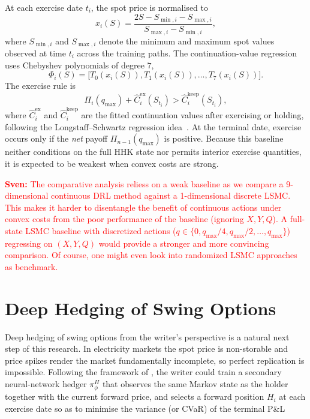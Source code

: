 \documentclass[a4paper,fleqn]{cas-dc}
\begin{document}
At each exercise date $t_i$, the spot price is normalised to
\[
x_i(S) =
\frac{2S - S_{\min,i} - S_{\max,i}}{S_{\max,i} - S_{\min,i}},
\]
where $S_{\min,i}$ and $S_{\max,i}$ denote the minimum and maximum spot values observed at time $t_i$ across the training paths. The continuation-value regression uses Chebyshev polynomials of degree $7$,
\[
\Phi_i(S) =
\bigl[T_0(x_i(S)),T_1(x_i(S)),\dots,T_7(x_i(S))\bigr].
\]
The exercise rule is
\[
\Pi_i(q_{\max}) + \widehat{C}_i^{\mathrm{ex}}(S_{t_i})
>
\widehat{C}_i^{\mathrm{keep}}(S_{t_i}),
\]
where $\widehat{C}_i^{\mathrm{ex}}$ and $\widehat{C}_i^{\mathrm{keep}}$ are the fitted continuation values after exercising or holding, following the Longstaff--Schwartz regression idea~\cite{longstaff2001valuing}. At the terminal date, exercise occurs only if the \emph{net} payoff $\Pi_{n-1}(q_{\max})$ is positive. Because this baseline neither conditions on the full HHK state nor permits interior exercise quantities, it is expected to be weakest when convex costs are strong.

\textcolor{red}{\textbf{Sven:} The comparative analysis reliess on a weak baseline as we compare a 9-dimensional continuous DRL method against a 1-dimensional discrete LSMC. This makes it harder to disentangle the benefit of continuous actions under convex costs from the poor performance of the baseline (ignoring $X, Y, Q$). A full-state LSMC baseline with discretized actions ($q \in \{0, q_{\max}/4, q_{\max}/2, \dots, q_{\max}\}$) regressing on $(X, Y, Q)$ would provide a stronger and more convincing comparison. Of course, one might even look into randomized LSMC approaches as benchmark.}

\section{Deep Hedging of Swing Options}
\label{sec:hedging}


Deep hedging of swing options from the writer's perspective is a natural next step of this research.
In electricity markets the spot price is non-storable and price spikes render the market fundamentally incomplete, so perfect replication is impossible.
Following the framework of \citet{buehler2019deephedging}, the writer could train a secondary neural-network hedger $\pi^H_\phi$ that observes the same Markov state as the holder together with the current forward price, and selects a forward position $H_i$ at each exercise date so as to minimise the variance (or CVaR) of the terminal P\&L
\end{document}

